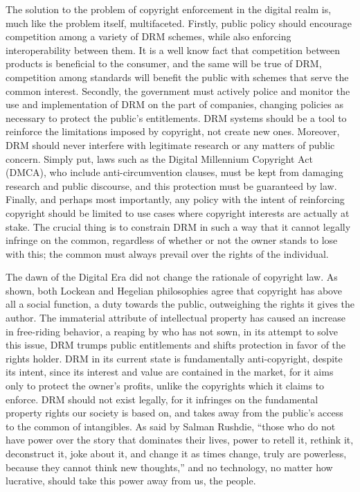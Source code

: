 \documentclass[12pt,letterpaper]{article}
\begin{document}
The solution to the problem of copyright enforcement in the digital realm is, much like the problem itself, multifaceted. Firstly, public policy should encourage competition among a variety of DRM schemes, while also enforcing interoperability between them. It is a well know fact that competition between products is beneficial to the consumer, and the same will be true of DRM, competition among standards will benefit the public with schemes that serve the common interest. Secondly, the
government must actively police and monitor the use and implementation of DRM on the part of companies, changing policies as necessary to protect the public's entitlements. DRM systems should be a tool to reinforce the limitations imposed by copyright, not create new ones. Moreover, DRM should never interfere with legitimate research or any matters of public concern. Simply put, laws such as the Digital Millennium Copyright Act (DMCA), who include anti-circumvention clauses, must be kept from
damaging research and public discourse, and this protection must be guaranteed by law. Finally, and perhaps most importantly, any policy with the intent of reinforcing copyright should be limited to use cases where copyright interests are actually at stake\autocite{felten-2005}. The crucial thing is to constrain DRM in such a way that it cannot legally infringe on the common, regardless of whether or not the owner stands to lose with this; the common must always prevail over the rights
of the individual.

The dawn of the Digital Era did not change the rationale of copyright law. As shown, both Lockean and Hegelian philosophies agree that copyright has above all a social function, a duty towards the public, outweighing the rights it gives the author. The immaterial attribute of intellectual property has caused an increase in free-riding behavior, a reaping by who has not sown, in its attempt to solve this issue, DRM trumps public entitlements and shifts protection in favor of the rights holder. DRM in its current state is fundamentally anti-copyright, despite its intent, since its interest and value are contained in the market, for it aims only to protect the owner's profits, unlike the copyrights which it claims to enforce. DRM should not exist legally, for it infringes on the fundamental property rights our society is based on, and takes away from the public's access to the common of intangibles. As said by Salman Rushdie, ``those who do not have power over the story that dominates their lives, power to retell it, rethink it, deconstruct it, joke about it, and change it as times change, truly are powerless, because they cannot think new thoughts,''\autocite{rushdie-1991} and no technology, no matter how lucrative, should take this power away from us, the people.

\newpage
\singlespace
\printbibliography[heading=bibintoc,title={Bibliography}]
\end{document}

